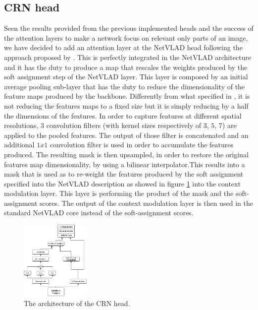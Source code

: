 \documentclass[10pt,twocolumn,letterpaper]{article}
\begin{document}
\subsection{CRN head}
Seen the results provided from the previous implemented heads and the success of the attention layers to make 
a network focus on relevant only parts of an image, we have decided to add an attention layer at the NetVLAD
head following the approach proposed by \cite{CRN}. This is perfectly integrated in the NetVLAD architecture and
it has the duty to produce a map that rescales the weights produced by the soft assignment step of the NetVLAD layer.
This layer is composed by an initial average pooling sub-layer
that has the duty to reduce the dimensionality of the feature maps produced by the backbone. 
Differently from what specified in \cite{CRN}, it is not reducing the features maps to a fixed 
size but it is simply reducing by a half the dimensions of the features. In order to capture features at different
spatial resolutions, $3$ convolution filters (with kernel sizes respectively of $3$, $5$, $7$) are applied to the pooled features.
The  output of those filter is concatenated and an additional $1x1$ convolution filter is used in order to accumulate the 
features produced. The resulting mask is then upsampled, in order to restore the original features map dimensionality,
by using a bilinear interpolator.This results into a mask that is used as to re-weight the features produced by the soft assignment specified
into the NetVLAD description as showed in figure \ref{fig:CRN:ark} into the context modulation layer. This layer is 
performing the product of the mask and the soft-assignment scores. The output of the context modulation layer is then used 
in the standard NetVLAD core instead of the soft-assignment scores. 

\begin{figure}
   \centering
   \includegraphics[width=0.3\textwidth]{img/CRN.png}
   \caption{The architecture of the CRN head.}
   \label{fig:CRN:ark}
\end{figure}
\end{document}
